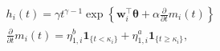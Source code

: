 \begin{gather}
  h_{i}(t) =
    \gamma t^{\gamma - 1} \exp\left\{
      \boldsymbol{w}_{i}^{\top}\boldsymbol{\theta} + \alpha \frac{\partial}{\partial t} m_{i}(t)
    \right\} \label{eqn:surv-submodel-def-one}\\
  \frac{\partial}{\partial t} m_{i}(t) =
    \eta^{b}_{1, i}\boldsymbol{1}_{\{t < \kappa_{i}\}} +
    \eta^{a}_{1, i}\boldsymbol{1}_{\{t \geq \kappa_{i}\}}, \label{eqn:surv-submodel-def-two}
\end{gather}